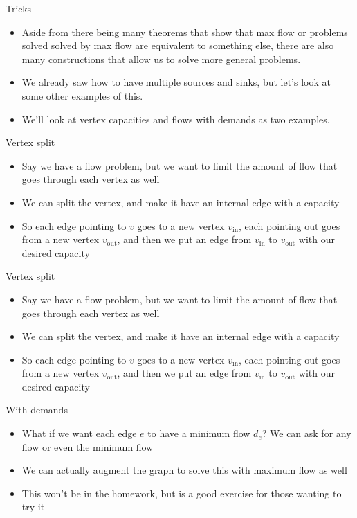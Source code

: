 \documentclass{beamer}
\begin{document}
	\begin{frame}[plain]{Tricks}
		\begin{itemize}
			\item Aside from there being many theorems that show that max flow or problems solved solved by max flow are equivalent to something else, there are also many constructions that allow us to solve more general problems.
			\item We already saw how to have multiple sources and sinks, but let's look at some other examples of this.
			\item We'll look at vertex capacities and flows with demands as two examples.
		\end{itemize}
	\end{frame}
	
	\begin{frame}[plain]{Vertex split}
		\begin{itemize}
			\item Say we have a flow problem, but we want to limit the amount of flow that goes through each vertex as well
			\item We can split the vertex, and make it have an internal edge with a capacity
			\item So each edge pointing to $v$ goes to a new vertex $v_{\text{in}}$, each pointing out goes from a new vertex $v_{\text{out}}$, and then we put an edge from $v_{\text{in}}$ to $v_{\text{out}}$ with our desired capacity
		\end{itemize}
	\end{frame}
	
	\begin{frame}[plain]{Vertex split}
		\begin{itemize}
			\item Say we have a flow problem, but we want to limit the amount of flow that goes through each vertex as well
			\item We can split the vertex, and make it have an internal edge with a capacity
			\item So each edge pointing to $v$ goes to a new vertex $v_{\text{in}}$, each pointing out goes from a new vertex $v_{\text{out}}$, and then we put an edge from $v_{\text{in}}$ to $v_{\text{out}}$ with our desired capacity
		\end{itemize}
	\end{frame}
	
	\begin{frame}[plain]{With demands}
		\begin{itemize}
			\item What if we want each edge $e$ to have a minimum flow $d_e$? We can ask for any flow or even the minimum flow
			\item We can actually augment the graph to solve this with maximum flow as well
			\item This won't be in the homework, but is a good exercise for those wanting to try it
		\end{itemize}
	\end{frame}
	
\end{document}
